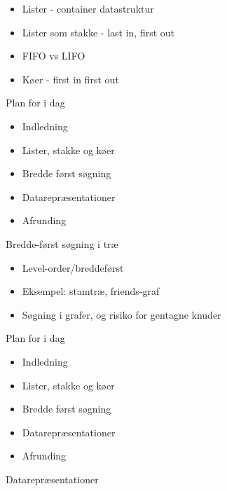 \documentclass[a4paper,landscape]{slides}
\begin{document}
\begin{slide}
\begin{itemize}
      \item     Lister - container datastruktur 
      \item     Lister som stakke - last in, first out
      \item     FIFO vs LIFO
      \item     Køer - first in first out
\end{itemize}\end{slide}\begin{slide} \begin{center} {\large 
            Plan for i dag
} \end{center} \begin{itemize} \addtolength{\itemsep}{-\baselineskip}
\item Indledning
\item Lister, stakke og køer
\item Bredde først søgning
\item Datarepræsentationer
\item Afrunding
\end{itemize}\end{slide}\begin{slide} \begin{center} {\large 
      Bredde-først søgning i træ
} \end{center} \begin{itemize} \addtolength{\itemsep}{-\baselineskip}
      \item     Level-order/breddeførst
      \item     Eksempel: stamtræ, friends-graf
      \item     Søgning i grafer, og risiko for gentagne knuder
\end{itemize}\end{slide}\begin{slide} \begin{center} {\large 
            Plan for i dag
} \end{center} \begin{itemize} \addtolength{\itemsep}{-\baselineskip}
\item Indledning
\item Lister, stakke og køer
\item Bredde først søgning
\item Datarepræsentationer
\item Afrunding
\end{itemize}\end{slide}\begin{slide} \begin{center} {\large 
      Datarepræsentationer
} \end{center} \begin{itemize} \addtolength{\itemsep}{-\baselineskip}

\end{itemize}
\end{slide}
\end{document}
